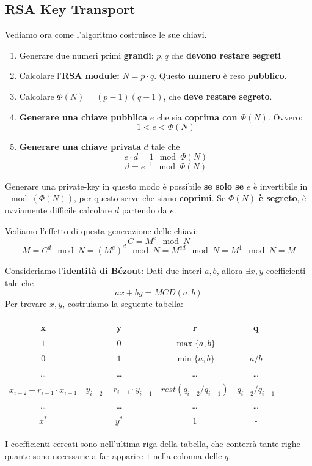 \subsection{RSA Key Transport}
Vediamo ora come  l'algoritmo costruisce le sue chiavi.
\begin{definition}\label{def:rsakey}
\begin{enumerate}
    \item Generare due numeri primi \textbf{grandi}: $p,q$ che \textbf{devono restare segreti}
    \item Calcolare l'\textbf{RSA module:} $N=p\cdot q$. Questo \textbf{numero} è reso \textbf{pubblico}.
    \item Calcolare $\Phi(N)=(p-1)(q-1)$, che \textbf{deve restare segreto}.
    \item \textbf{Generare una chiave pubblica} $e$ che sia \textbf{coprima con $\Phi(N)$}. Ovvero: 
    \[1<e<\Phi(N)\]
    \item \textbf{Generare una chiave privata} $d$ tale che
    \[e\cdot d=1\mod\Phi(N)\]
    \[d=e^{-1}\mod\Phi(N)\]
\end{enumerate}
\begin{remark}
Generare una private-key in questo modo è possibile \textbf{se solo se} $e$ è invertibile in $\mod(\Phi(N))$, per questo serve che siano \textbf{coprimi}. Se $\Phi(N)$ \textbf{è segreto}, è ovviamente difficile calcolare $d$ partendo da $e$.
\end{remark}
\end{definition}
Vediamo l'effetto di questa generazione delle chiavi:
\[C=M^e\mod N\]
\[M=C^d\mod N=(M^e)^d\mod N=M^{ed}\mod N=M^1\mod N = M\]
\begin{definition}\label{def:exteuclid}
Consideriamo l'\textbf{identità di Bézout}: Dati due interi $a,b$, allora $\exists x,y$ coefficienti tale che
\[ax+by=MCD(a,b)\]
Per trovare $x,y$, costruiamo la seguente tabella:
\begin{center}
\begin{tabular}{|c|c|c|c|}
\hline
    x & y & r & q \\
\hline
    $1$ & $0$ & $\max\{a,b\}$& - \\ 
\hline
    $0$ & $1$ & $\min\{a,b\}$& $a/b$\\
 \hline
    \dots&\dots&\dots&\dots\\
\hline
    $x_{i-2}-r_{i-1}\cdot{x_{i-1}}$&$y_{i-2}-r_{i-1}\cdot{y_{i-1}}$&
    $rest(q_{i-2}/q_{i-1})$&$q_{i-2}/q_{i-1}$\\
\hline
    \dots&\dots&\dots&\dots\\
\hline
    $x^*$&$y^*$&$1$&-\\
\hline
\end{tabular}
\end{center}
I coefficienti cercati sono nell'ultima riga della tabella, che conterrà tante righe quante sono necessarie a far apparire $1$ nella colonna delle $q$. 
\end{definition}
